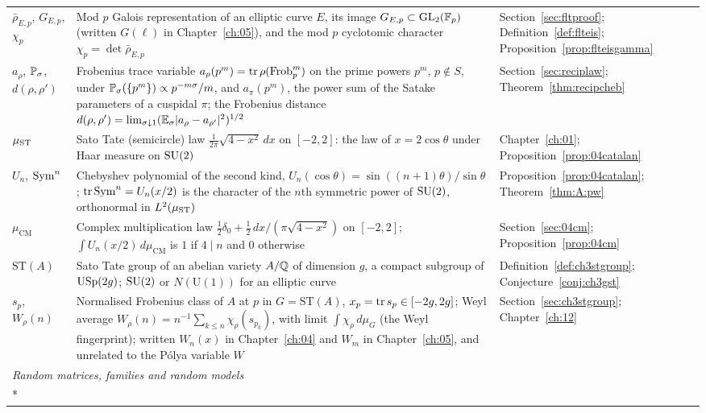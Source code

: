 {\begin{longtable}{p{0.8in}p{2.65in}p{0.95in}}
\raggedright $\bar\rho_{E,p}$, $G_{E,p}$, $\chi_p$ & \raggedright Mod $p$ Galois representation of an elliptic curve $E$, its image $G_{E,p}\subset\mathrm{GL}_2(\mathbb F_p)$ (written $G(\ell)$ in Chapter~\ref{ch:05}), and the mod $p$ cyclotomic character $\chi_p=\det\bar\rho_{E,p}$ & \raggedright Section~\ref{sec:fltproof}; Definition~\ref{def:flteis}; Proposition~\ref{prop:flteisgamma}\tabularnewline[1pt]
\raggedright $a_\rho$, $\mathbb{P}_\sigma$, $d(\rho,\rho')$ & \raggedright Frobenius trace variable $a_\rho(p^m)=\operatorname{tr}\rho(\operatorname{Frob}_p^m)$ on the prime powers $p^m$, $p\notin S$, under $\mathbb{P}_\sigma(\{p^m\})\propto p^{-m\sigma}/m$, and $a_\pi(p^m)$, the power sum of the Satake parameters of a cuspidal $\pi$; the Frobenius distance $d(\rho,\rho')=\lim_{\sigma\downarrow1}(\mathbb{E}_\sigma|a_\rho-a_{\rho'}|^2)^{1/2}$ & \raggedright Section~\ref{sec:reciplaw}; Theorem~\ref{thm:recipcheb}\tabularnewline[1pt]
\raggedright $\mu_{\mathrm{ST}}$ & \raggedright Sato Tate (semicircle) law $\frac1{2\pi}\sqrt{4-x^2}\,dx$ on $[-2,2]$: the law of $x=2\cos\theta$ under Haar measure on $\mathrm{SU}(2)$ & \raggedright Chapter~\ref{ch:01}; Proposition~\ref{prop:04catalan}\tabularnewline[1pt]
\raggedright $U_n$, $\operatorname{Sym}^n$ & \raggedright Chebyshev polynomial of the second kind, $U_n(\cos\theta)=\sin((n+1)\theta)/\sin\theta$; $\operatorname{tr}\operatorname{Sym}^n=U_n(x/2)$ is the character of the $n$th symmetric power of $\mathrm{SU}(2)$, orthonormal in $L^2(\mu_{\mathrm{ST}})$ & \raggedright Proposition~\ref{prop:04catalan}; Theorem~\ref{thm:A:pw}\tabularnewline[1pt]
\raggedright $\mu_{\mathrm{CM}}$ & \raggedright Complex multiplication law $\frac12\delta_0+\frac12\,dx/(\pi\sqrt{4-x^2})$ on $[-2,2]$; $\int U_n(x/2)\,d\mu_{\mathrm{CM}}$ is $1$ if $4\mid n$ and $0$ otherwise & \raggedright Section~\ref{sec:04cm}; Proposition~\ref{prop:04cm}\tabularnewline[1pt]
\raggedright $\mathrm{ST}(A)$ & \raggedright Sato Tate group of an abelian variety $A/\mathbb{Q}$ of dimension $g$, a compact subgroup of $\mathrm{USp}(2g)$; $\mathrm{SU}(2)$ or $N(\mathrm U(1))$ for an elliptic curve & \raggedright Definition~\ref{def:ch3stgroup}; Conjecture~\ref{conj:ch3gst}\tabularnewline[1pt]
\raggedright $s_p$, $W_\rho(n)$ & \raggedright Normalised Frobenius class of $A$ at $p$ in $G=\mathrm{ST}(A)$, $x_p=\operatorname{tr} s_p\in[-2g,2g]$; Weyl average $W_\rho(n)=n^{-1}\sum_{k\le n}\chi_\rho(s_{p_k})$, with limit $\int\chi_\rho\,d\mu_G$ (the Weyl fingerprint); written $W_n(x)$ in Chapter~\ref{ch:04} and $W_m$ in Chapter~\ref{ch:05}, and unrelated to the P\'olya variable $W$ & \raggedright Section~\ref{sec:ch3stgroup}; Chapter~\ref{ch:12}\tabularnewline[1pt]
\midrule
\multicolumn{3}{l}{\textit{Random matrices, families and random models}}\\*

\end{longtable}}
